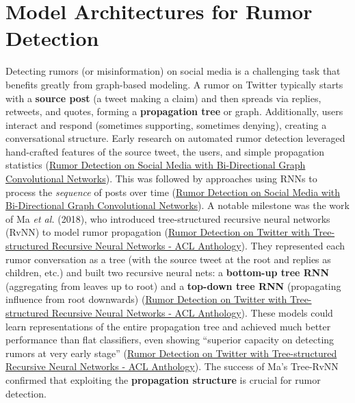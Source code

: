 \documentclass[12pt,a4paper]{report}
\begin{document}
\chapter{Model Architectures for Rumor Detection}

Detecting rumors (or misinformation) on social media is a challenging task that benefits greatly from graph-based modeling. A rumor on Twitter typically starts with a \textbf{source post} (a tweet making a claim) and then spreads via replies, retweets, and quotes, forming a \textbf{propagation tree} or graph. Additionally, users interact and respond (sometimes supporting, sometimes denying), creating a conversational structure. Early research on automated rumor detection leveraged hand-crafted features of the source tweet, the users, and simple propagation statistics (\href{https://ojs.aaai.org/index.php/AAAI/article/view/5393/5249#:~:text=Conventional%20detection%20methods%20mainly%20adopt,Giudice%202010}{Rumor Detection on Social Media with Bi-Directional Graph Convolutional Networks}). This was followed by approaches using RNNs to process the \textit{sequence} of posts over time (\href{https://ojs.aaai.org/index.php/AAAI/article/view/5393/5249#:~:text=Recent%20studies%20have%20exploited%20deep,LSTM%29%2C%20Gated%20Recurrent}{Rumor Detection on Social Media with Bi-Directional Graph Convolutional Networks}). A notable milestone was the work of Ma \textit{et al.} (2018), who introduced tree-structured recursive neural networks (RvNN) to model rumor propagation (\href{https://aclanthology.org/P18-1184/#:~:text=Automatic%20rumor%20detection%20is%20technically,rumors%20at%20very%20early%20stage}{Rumor Detection on Twitter with Tree-structured Recursive Neural Networks - ACL Anthology}). They represented each rumor conversation as a tree (with the source tweet at the root and replies as children, etc.) and built two recursive neural nets: a \textbf{bottom-up tree RNN} (aggregating from leaves up to root) and a \textbf{top-down tree RNN} (propagating influence from root downwards) (\href{https://aclanthology.org/P18-1184/#:~:text=Automatic%20rumor%20detection%20is%20technically,rumors%20at%20very%20early%20stage}{Rumor Detection on Twitter with Tree-structured Recursive Neural Networks - ACL Anthology}). These models could learn representations of the entire propagation tree and achieved much better performance than flat classifiers, even showing “superior capacity on detecting rumors at very early stage” (\href{https://aclanthology.org/P18-1184/#:~:text=based%20on%20a%20bottom,rumors%20at%20very%20early%20stage}{Rumor Detection on Twitter with Tree-structured Recursive Neural Networks - ACL Anthology}). The success of Ma’s Tree-RvNN confirmed that exploiting the \textbf{propagation structure} is crucial for rumor detection.
\end{document}

